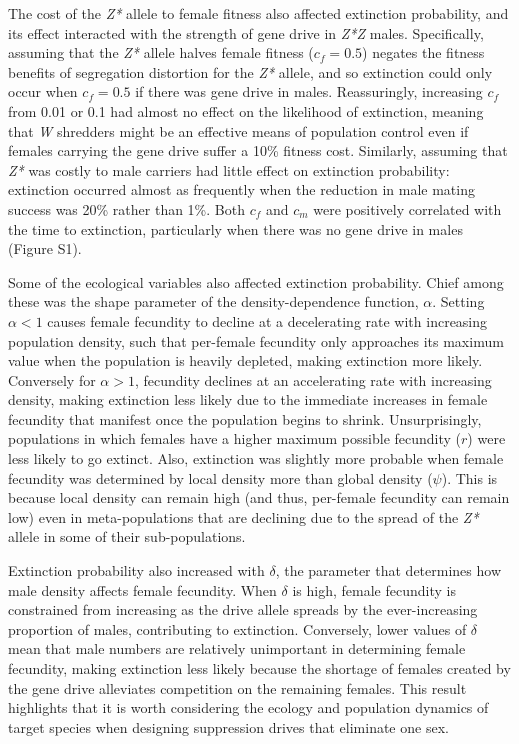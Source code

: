 \documentclass[]{rsos}%
\begin{document}
The cost of the \emph{Z*} allele to female fitness also affected
extinction probability, and its effect interacted with the strength of
gene drive in \emph{Z*Z} males. Specifically, assuming that the
\emph{Z*} allele halves female fitness (\(c_f = 0.5\)) negates the
fitness benefits of segregation distortion for the \emph{Z*} allele, and
so extinction could only occur when \(c_f = 0.5\) if there was gene
drive in males. Reassuringly, increasing \(c_f\) from 0.01 or 0.1 had
almost no effect on the likelihood of extinction, meaning that \emph{W}
shredders might be an effective means of population control even if
females carrying the gene drive suffer a 10\% fitness cost. Similarly,
assuming that \emph{Z*} was costly to male carriers had little effect on
extinction probability: extinction occurred almost as frequently when
the reduction in male mating success was 20\% rather than 1\%. Both
\(c_f\) and \(c_m\) were positively correlated with the time to
extinction, particularly when there was no gene drive in males (Figure
S1).

Some of the ecological variables also affected extinction probability.
Chief among these was the shape parameter of the density-dependence
function, \(\alpha\). Setting \(\alpha < 1\) causes female fecundity to
decline at a decelerating rate with increasing population density, such
that per-female fecundity only approaches its maximum value when the
population is heavily depleted, making extinction more likely.
Conversely for \(\alpha > 1\), fecundity declines at an accelerating
rate with increasing density, making extinction less likely due to the
immediate increases in female fecundity that manifest once the
population begins to shrink. Unsurprisingly, populations in which
females have a higher maximum possible fecundity (\(r\)) were less
likely to go extinct. Also, extinction was slightly more probable when
female fecundity was determined by local density more than global
density (\(\psi\)). This is because local density can remain high (and
thus, per-female fecundity can remain low) even in meta-populations that
are declining due to the spread of the \emph{Z*} allele in some of their
sub-populations.

Extinction probability also increased with \(\delta\), the parameter
that determines how male density affects female fecundity. When
\(\delta\) is high, female fecundity is constrained from increasing as
the drive allele spreads by the ever-increasing proportion of males,
contributing to extinction. Conversely, lower values of \(\delta\) mean
that male numbers are relatively unimportant in determining female
fecundity, making extinction less likely because the shortage of females
created by the gene drive alleviates competition on the remaining
females. This result highlights that it is worth considering the ecology
and population dynamics of target species when designing suppression
drives that eliminate one sex.
\end{document}
